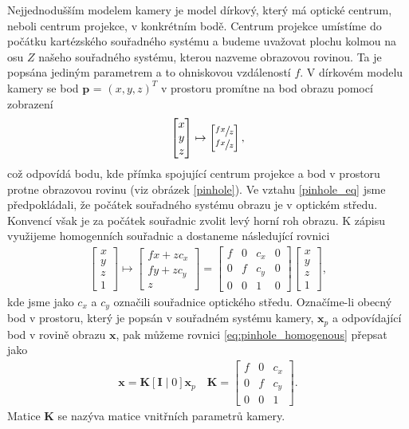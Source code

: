 \documentclass[twoside]{ctuthesis}
\newcommand{\tl}[1]{$\mathbf{#1}$}
\begin{document}
Nejjednodušším modelem kamery je model dírkový, který má optické centrum, neboli centrum projekce, v konkrétním bodě. Centrum projekce umístíme do počátku kartézského souřadného systému a budeme uvažovat plochu kolmou na osu $Z$ našeho souřadného systému, kterou nazveme obrazovou rovinou. Ta je popsána jediným parametrem a to ohniskovou vzdáleností $f$. V dírkovém modelu kamery se bod \tl{p} = $(x,y,z)^T$ v prostoru promítne na bod obrazu pomocí zobrazení
\begin{align}
    \begin{bmatrix} x \\ y \\ z \end{bmatrix} \mapsto \begin{bmatrix} \sfrac{fx}{z} \\ \sfrac{fx}{z} \end{bmatrix},
    \label{pinhole_eq}
\end{align}
což odpovídá bodu, kde přímka spojující centrum projekce a bod v prostoru protne obrazovou rovinu (viz obrázek \ref{pinhole}). Ve vztahu \ref{pinhole_eq} jsme předpokládali, že počátek souřadného systému obrazu je v optickém středu. Konvencí však je za počátek souřadnic zvolit levý horní roh obrazu. K zápisu využijeme homogenních souřadnic a dostaneme následující rovnici 
\begin{align}
    \begin{bmatrix} x \\ y \\ z \\ 1 \end{bmatrix} \mapsto \begin{bmatrix} fx + zc_x \\ fy + zc_y \\ z \end{bmatrix} = \begin{bmatrix} f & 0 & c_x & 0 \\ 0 & f & c_y & 0 \\ 0 & 0 & 1 &0 \end{bmatrix} \begin{bmatrix} x \\ y \\ z \\ 1 \end{bmatrix},
    \label{eq:pinhole_homogenous}
\end{align}
kde jsme jako $c_x$ a $c_y$ označili souřadnice optického středu. Označíme-li obecný bod v prostoru, který je popsán v souřadném systému kamery, \tl{x}$_p$ a odpovídající bod v rovině obrazu \tl{x}, pak můžeme rovnici \ref{eq:pinhole_homogenous} přepsat jako
\begin{align}
    \mathbf{x} = \mathbf{K}[\mathbf{I}\; |\; 0 ]\mathbf{x}_p \quad \mathbf{K} = \begin{bmatrix} f & 0 & c_x  \\ 0 & f & c_y  \\ 0 & 0 & 1  \end{bmatrix}.
    \label{intrinstic}
\end{align}
Matice \tl{K} se nazýva matice vnitřních parametrů kamery.
\end{document}
